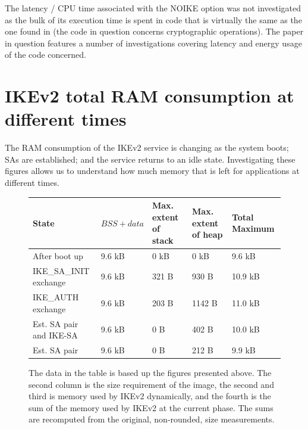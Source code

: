\documentclass[final,a4paper,twoside,11pt,onecolumn]{report}
\begin{document}
\label{sec:latency-similar}
The latency / CPU time associated with the NOIKE option was not investigated as the bulk of its execution time is spent in code  that is virtually the same as the one found in \cite{raza11securing} (the code in question concerns cryptographic operations). The paper in question features a number of investigations covering latency and energy usage of the code concerned.


\section{IKEv2 total RAM consumption at different times}
\label{sec:eval-sum}
The RAM consumption of the IKEv2 service is changing as the system boots; SAs are established; and the service returns to an idle state. Investigating these figures allows us to understand how much memory that is left for applications at different times.

\begin{figure}[h]
\centering
\begin{tabular}{ p{2.25cm} | l | p{2.25cm} | p{2.25cm} | p{2.25cm} }                        
State                   & $BSS + data$ & Max. extent of stack  & Max. extent of heap   & Total Maximum  \\ \hline
After boot up           & 9.6 kB       & 0 kB                  & 0 kB                  & 9.6 kB       \\
IKE\_SA\_INIT exchange  & 9.6 kB       & 321 B                 & 930 B                 & 10.9 kB      \\
IKE\_AUTH exchange      & 9.6 kB       & 203 B                 & 1142 B                & 11.0 kB      \\
Est. SA pair and IKE-SA & 9.6 kB       & 0 B                   & 402 B                 & 10.0 kB      \\
Est. SA pair            & 9.6 kB       & 0 B                   & 212 B                 & 9.9 kB
\end{tabular}
\caption{The data in the table is based up the figures presented above. The second column is the size requirement of the image, the second and third is memory used by IKEv2 dynamically, and the fourth is the sum of the memory used by IKEv2 at the current phase. The sums are recomputed from the original, non-rounded, size measurements.}
\end{figure}
\end{document}
